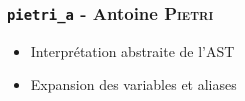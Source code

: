 \subsubsection{\texttt{pietri\_a} - Antoine \textsc{Pietri}}

\begin{itemize}
    \item Interprétation abstraite de l'AST
    \item Expansion des variables et aliases
\end{itemize}
